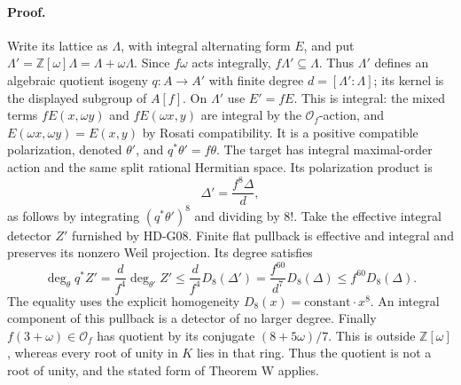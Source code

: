 \paragraph{Proof.}
Write its lattice as $\Lambda$, with integral alternating form $E$, and put
$\Lambda'=\mathbb Z[\omega]\Lambda=\Lambda+\omega\Lambda$.
Since $f\omega$ acts integrally, $f\Lambda'\subseteq\Lambda$.
Thus $\Lambda'$ defines an algebraic quotient isogeny
$q:A\to A'$ with finite degree $d=[\Lambda':\Lambda]$;
its kernel is the displayed subgroup of $A[f]$.
On $\Lambda'$ use $E'=fE$. This is integral: the mixed terms
$fE(x,\omega y)$ and $fE(\omega x,y)$ are integral by the
$\mathcal O_f$-action, and
$E(\omega x,\omega y)=E(x,y)$ by Rosati compatibility.
It is a positive compatible polarization, denoted $\theta'$, and
$q^*\theta'=f\theta$. The target has integral maximal-order action
and the same split rational Hermitian space. Its polarization product is
\[
\Delta'=\frac{f^8\Delta}{d},
\]
as follows by integrating $(q^*\theta')^8$ and dividing by $8!$.
Take the effective integral detector $Z'$ furnished by HD-G08.
Finite flat pullback is effective and integral and preserves its nonzero
Weil projection. Its degree satisfies
\[
\deg_\theta q^*Z'
=\frac d{f^4}\deg_{\theta'}Z'
\le\frac d{f^4}D_8(\Delta')
=\frac{f^{60}}{d^7}D_8(\Delta)
\le f^{60}D_8(\Delta).
\]
The equality uses the explicit homogeneity $D_8(x)=\text{constant}\cdot x^8$.
An integral component of this pullback is a detector of no larger degree.
Finally $f(3+\omega)\in\mathcal O_f$ has quotient by its conjugate
$(8+5\omega)/7$. This is outside $\mathbb Z[\omega]$, whereas every
root of unity in $K$ lies in that ring. Thus the quotient is not a
root of unity, and the stated form of Theorem W applies.

